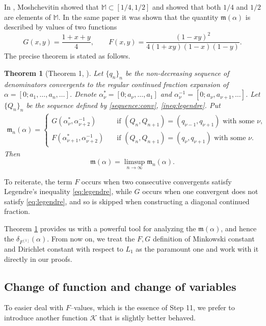 \documentclass[11pt]{amsart}
\newtheorem{theorem}{Theorem}[section]
\newcommand{\MS}{\mathbb M}
\newcommand{\Kfun}{\mathcal K}
\begin{document}
In \cite{MR3025470}, Moshchevitin showed that $\MS\subset[1/4,1/2]$ and showed that both $1/4$ and $1/2$ are elements
of $\MS$. In the same paper it was shown that the quantity $\mathfrak{m}(\alpha)$ is described by values of two functions
$$
        G(x,y)=\frac{1+x+y}{4},
        \qquad
        F(x,y)=\frac{(1-xy)^2}{4(1+xy)(1-x)(1-y)}.
$$
The precise theorem is stated as follows.
\begin{theorem}[Theorem 1, \cite{MR3025470}]\label{thm:mosh:FG}
Let $\{q_n\}_n$ be the non-decreasing sequence of denominators convergents to the regular continued fraction expansion of $\alpha=[0;a_1,\ldots,a_n,\ldots]$. Denote $\alpha^*_\nu=[0;a_\nu,\ldots,a_1]$ and $\alpha^{-1}_{\nu}=[0;a_\nu,a_{\nu+1},\ldots]$. Let $\{Q_n\}_n$ be the sequence defined by \eqref{sequence:conv}, \eqref{ineq:legendre}.
Put
\begin{align*}
\mathfrak{m}_n(\alpha) =  \begin{cases} 
G(\alpha_\nu^*, \alpha_{\nu+2}^{-1}) \quad &\text{if } (Q_n,Q_{n+1})=(q_{\nu-1},q_{\nu+1}) \text{ with some } \nu,  \\  
F(\alpha_{\nu+1}^*, \alpha_{\nu+2}^{-1}) \quad &\text{if } (Q_n,Q_{n+1})=(q_{\nu},q_{\nu+1})  \text{ with some } \nu.
 \end{cases}
\end{align*}
Then
$$
\mathfrak{m}(\alpha) = \limsup_{n\to\infty} \mathfrak{m}_n(\alpha).
$$
\end{theorem}

To reiterate, the term $F$ occurs when two consecutive convergents satisfy Legendre's inequality \eqref{eq:legendre}, while $G$ occurs when one convergent does not satisfy \eqref{eq:legendre}, and so is skipped when constructing a diagonal continued fraction.  

Theorem \ref{thm:mosh:FG} provides us with a powerful tool for analyzing the $\mathfrak m(\alpha)$, and hence the $\delta_{F^{[1]}}(\alpha)$. From now on, we treat the $F,G$ definition of Minkowski constant and Dirichlet constant with respect to $L_1$ as the paramount one and work with it directly in our proofs.


\subsection{Change of function and change of variables}\label{subsec:change-of-var}
To easier deal with $F$--values, which is the essence of Step 11, we prefer to introduce another function $\Kfun$ that is slightly better behaved.
\end{document}
